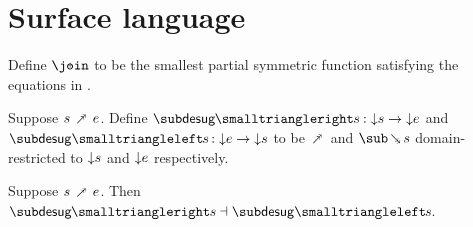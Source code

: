 \section{Surface language}





\begin{definition}
   Define $\disjjoin$ to be the smallest partial symmetric function satisfying the equations in .
\end{definition}









\begin{definition}
     Suppose $s \desugarFwdR e$. Define $\desugarFwdF{s}: \Below{s} \to \Below{e}$ and $\desugarBwdF{s}: \Below{e} \to \Below{s}$ to be $\desugarFwdR$ and $\desugarBwdR{s}$ domain-restricted to ${\downarrow}{s}$ and ${\downarrow}{e}$ respectively.
\end{definition}

\begin{theorem}
  \label{thm:surface-language:desugar:gc}
     Suppose $s \desugarFwdR e$. Then $\desugarFwdF{s} \adjoint \desugarBwdF{s}$.
\end{theorem}
